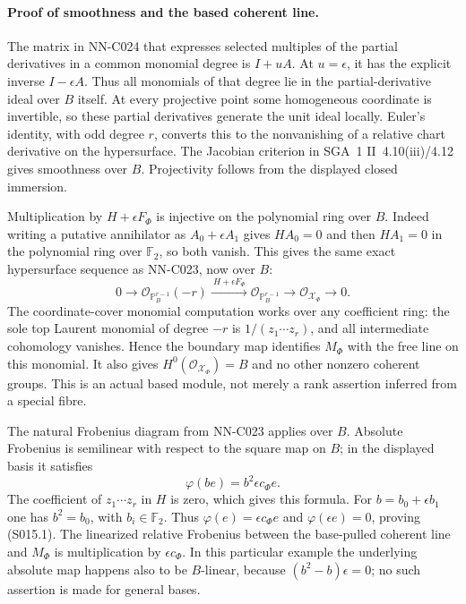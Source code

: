 \paragraph{Proof of smoothness and the based coherent line.}
The matrix in NN-C024 that expresses selected multiples of the partial
derivatives in a common monomial degree is $I+uA$. At $u=\epsilon$,
it has the explicit inverse $I-\epsilon A$. Thus all monomials of
that degree lie in the partial-derivative ideal over $B$ itself.
At every projective point some homogeneous coordinate is invertible,
so these partial derivatives generate the unit ideal locally.
Euler's identity, with odd degree $r$, converts this to the
nonvanishing of a relative chart derivative on the hypersurface.
The Jacobian criterion in SGA~1 II~4.10(iii)/4.12 gives smoothness
over $B$. Projectivity follows from the displayed closed immersion.

Multiplication by $H+\epsilon F_\Phi$ is injective on the polynomial
ring over $B$. Indeed writing a putative annihilator as
$A_0+\epsilon A_1$ gives $HA_0=0$ and then $HA_1=0$ in the
polynomial ring over $\mathbb F_2$, so both vanish. This gives
the same exact hypersurface sequence as NN-C023, now over $B$:
\[
 0\longrightarrow\mathcal O_{\mathbb P^{r-1}_B}(-r)
   \xrightarrow{\ H+\epsilon F_\Phi\ }
     \mathcal O_{\mathbb P^{r-1}_B}
   \longrightarrow\mathcal O_{\mathcal X_\Phi}\longrightarrow0.
\]
The coordinate-cover monomial computation works over any coefficient
ring: the sole top Laurent monomial of degree $-r$ is
$1/(z_1\cdots z_r)$, and all intermediate cohomology vanishes.
Hence the boundary map identifies $M_\Phi$ with the free line
on this monomial. It also gives $H^0(\mathcal O_{\mathcal X_\Phi})=B$
and no other nonzero coherent groups. This is an actual based module,
not merely a rank assertion inferred from a special fibre.

The natural Frobenius diagram from NN-C023 applies over $B$.
Absolute Frobenius is semilinear with respect to the square map on $B$;
in the displayed basis it satisfies
\[
       \varphi(b e)=b^2\epsilon c_\Phi e.
\]
The coefficient of $z_1\cdots z_r$ in $H$ is zero, which gives
this formula. For $b=b_0+\epsilon b_1$ one has $b^2=b_0$, with
$b_i\in\mathbb F_2$. Thus $\varphi(e)=\epsilon c_\Phi e$ and
$\varphi(\epsilon e)=0$, proving (S015.1). The linearized relative
Frobenius between the base-pulled coherent line and $M_\Phi$ is
multiplication by $\epsilon c_\Phi$. In this particular example the
underlying absolute map happens also to be $B$-linear, because
$(b^2-b)\epsilon=0$; no such assertion is made for general bases.

